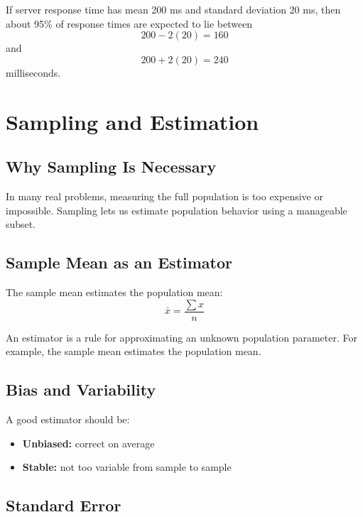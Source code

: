\documentclass[11pt,a4paper]{article}
\begin{document}
\begin{examplebox}
If server response time has mean 200 ms and standard deviation 20 ms, then about 95\% of response times are expected to lie between
\[
200 - 2(20) = 160
\]
and
\[
200 + 2(20) = 240
\]
milliseconds.
\end{examplebox}

\section{Sampling and Estimation}

\subsection{Why Sampling Is Necessary}

In many real problems, measuring the full population is too expensive or impossible. Sampling lets us estimate population behavior using a manageable subset.

\subsection{Sample Mean as an Estimator}

The sample mean estimates the population mean:
\[
\bar{x} = \frac{\sum x}{n}
\]

\begin{conceptbox}[Estimator]
An estimator is a rule for approximating an unknown population parameter. For example, the sample mean estimates the population mean.
\end{conceptbox}

\subsection{Bias and Variability}

A good estimator should be:

\begin{itemize}[leftmargin=*]
  \item \textbf{Unbiased:} correct on average
  \item \textbf{Stable:} not too variable from sample to sample
\end{itemize}

\subsection{Standard Error}
\end{document}
